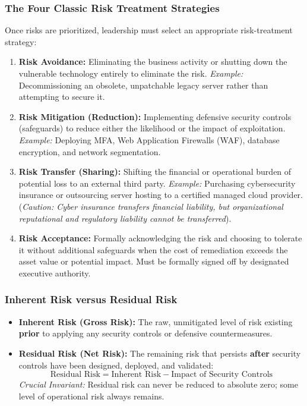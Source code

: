 \subsubsection{The Four Classic Risk Treatment Strategies}

Once risks are prioritized, leadership must select an appropriate risk-treatment strategy:
\begin{enumerate}
\item \textbf{Risk Avoidance:} Eliminating the business activity or shutting down the vulnerable technology entirely to eliminate the risk. \textit{Example:} Decommissioning an obsolete, unpatchable legacy server rather than attempting to secure it.
\item \textbf{Risk Mitigation (Reduction):} Implementing defensive security controls (safeguards) to reduce either the likelihood or the impact of exploitation. \textit{Example:} Deploying MFA, Web Application Firewalls (WAF), database encryption, and network segmentation.
\item \textbf{Risk Transfer (Sharing):} Shifting the financial or operational burden of potential loss to an external third party. \textit{Example:} Purchasing cybersecurity insurance or outsourcing server hosting to a certified managed cloud provider. (\textit{Caution: Cyber insurance transfers financial liability, but organizational reputational and regulatory liability cannot be transferred}).
\item \textbf{Risk Acceptance:} Formally acknowledging the risk and choosing to tolerate it without additional safeguards when the cost of remediation exceeds the asset value or potential impact. Must be formally signed off by designated executive authority.
\end{enumerate}

\subsubsection{Inherent Risk versus Residual Risk}

\begin{itemize}
\item \textbf{Inherent Risk (Gross Risk):} The raw, unmitigated level of risk existing \textbf{prior} to applying any security controls or defensive countermeasures.
\item \textbf{Residual Risk (Net Risk):} The remaining risk that persists \textbf{after} security controls have been designed, deployed, and validated:
\[ \text{Residual Risk} = \text{Inherent Risk} - \text{Impact of Security Controls} \]
\textit{Crucial Invariant:} Residual risk can never be reduced to absolute zero; some level of operational risk always remains.
\end{itemize}

